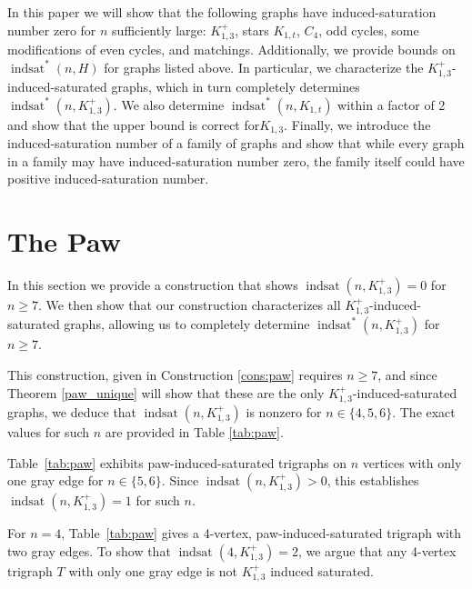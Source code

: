 \documentclass[12pt]{amsart}
\theoremstyle{plain}
\theoremstyle{definition}
\theoremstyle{remark}
\newcommand{\indsat}[2]{\ensuremath{\operatorname{indsat}(#1,#2)}\xspace}
\newcommand{\sis}[2]{\ensuremath{{\operatorname{indsat}}^*(#1,#2)}\xspace}
\newcommand{\paw}{\ensuremath{K_{1,3}^+}\xspace}
\newcommand{\arxiv}{www.arxivurl.edu}
\begin{document}
In this paper we will show that the following graphs have induced-saturation number zero for $n$ sufficiently large: $\paw$, stars $K_{1,t}$, $C_4$, odd cycles,  some modifications of even cycles, and matchings. %
Additionally, we provide bounds on $\sis{n}{H}$ for graphs listed above.  In particular, we characterize the $\paw$-induced-saturated graphs, which in turn completely determines $\sis{n}{\paw}$.  We also determine $\sis{n}{K_{1,t}}$ within a factor of 2 and show that the upper bound is correct for$K_{1,3}$.  Finally, we introduce the induced-saturation number of a family of graphs and show that while every graph in a family may have induced-saturation number zero, the family itself could have positive induced-saturation number.






\section{The Paw}
In this section we provide a construction that shows $\indsat{n}{\paw} = 0$ for $n \ge 7$.  We then show that our construction characterizes all $\paw$-induced-saturated graphs, allowing us to completely determine $\sis{n}{\paw}$ for $n \ge 7$.

This construction, given in Construction \ref{cons:paw} requires $n \ge 7$, and since Theorem \ref{paw_unique} will show that these are the only $\paw$-induced-saturated graphs, we deduce that $\indsat{n}{\paw}$ is nonzero for $n \in \{4,5,6\}$.  The exact values for such $n$ are provided in Table \ref{tab:paw}. %

Table~\ref{tab:paw} exhibits paw-induced-saturated trigraphs on $n$ vertices with only one gray edge for $n \in \{5,6\}$. Since $\indsat{n}{\paw}>0$, this establishes $\indsat{n}{\paw}=1$ for such $n$.

For $n=4$, Table~\ref{tab:paw} gives a 4-vertex, paw-induced-saturated trigraph with two gray edges. To show that $\indsat{4}{\paw} = 2$, we argue that any 4-vertex trigraph $T$ with only one gray edge is not \paw induced saturated.
\end{document}
